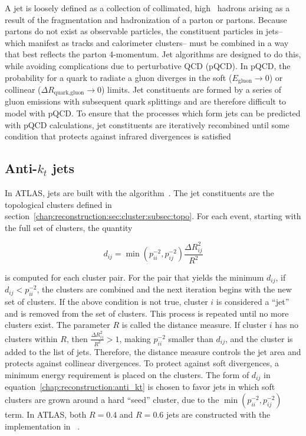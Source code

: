 
A jet is loosely defined as a collection of collimated, high
\pt~hadrons arising as a result of the fragmentation and hadronization
of a parton or partons. Because partons do not exist as
observable particles, the constituent particles in jets-- which
manifest as tracks and calorimeter clusters-- must be combined in a
way that best reflects the parton 4-momentum. Jet algorithms are
designed to do this, while avoiding complications due to perturbative
QCD (pQCD). In pQCD, the probability for a quark to radiate a gluon
diverges in the soft ($E_{\textrm{gluon}}\rightarrow 0$) or collinear
  ($\Delta R_{\textrm{quark,gluon}}\rightarrow 0$) limits. Jet
  constituents are formed by a series of gluon emissions with
  subsequent quark splittings and are therefore difficult to model
  with pQCD. To ensure that the processes which form jets
  can be predicted with pQCD calculations, jet
  constituents are iteratively recombined until some condition
  that protects against infrared divergences is satisfied

\subsection{Anti-$k_t$ jets}

In ATLAS, jets are built with the \antikt
algorithm~\cite{bib:Cacciari:2008gp}. The jet constituents are the
topological clusters defined in
section~\ref{chap:reconstruction:sec:cluster:subsec:topo}. For each
event, starting with the full set of clusters, the quantity

\begin{equation}
d_{ij} = \min{(p_{ii}^{-2},p_{ij}^{-2})}\frac{\Delta{R_{ij}^2}}{R^2}
\label{chap:reconstruction:anti_kt}
\end{equation}

\noindent
is computed for each cluster pair. For the pair that yields the
minimum $d_{ij}$, if $d_{ij} < p_{ii}^{-2}$, the clusters are combined
and the next iteration begins with the new set of clusters. If the
above condition is not true, cluster $i$ is considered a ``jet'' and
is removed from the set of clusters. This process is repeated until no
more clusters exist. The parameter $R$ is called the distance
measure. If cluster $i$ has no clusters within $R$, then
$\frac{\Delta{R_{ij}^2}}{R^2} > 1$, making $p_{ii}^{-2}$ smaller than
$d_{ij}$, and the cluster is added to the list of
jets. Therefore, the distance measure controls the jet area and
protects against collinear divergences. To protect against soft
divergences, a minimum energy requirement is placed on the
clusters. The form of $d_{ij}$ in
equation~\ref{chap:reconstruction:anti_kt} is chosen to favor jets in
which soft clusters are grown around a hard ``seed'' cluster, due to
the $\min{(p_{ii}^{-2},p_{ij}^{-2})}$ term. In ATLAS, both $R=0.4$ and
$R=0.6$ jets are constructed with the implementation in
\fastjet~\cite{bib:Cacciari:2005hq,bib:Cacciari:2011ma}.

